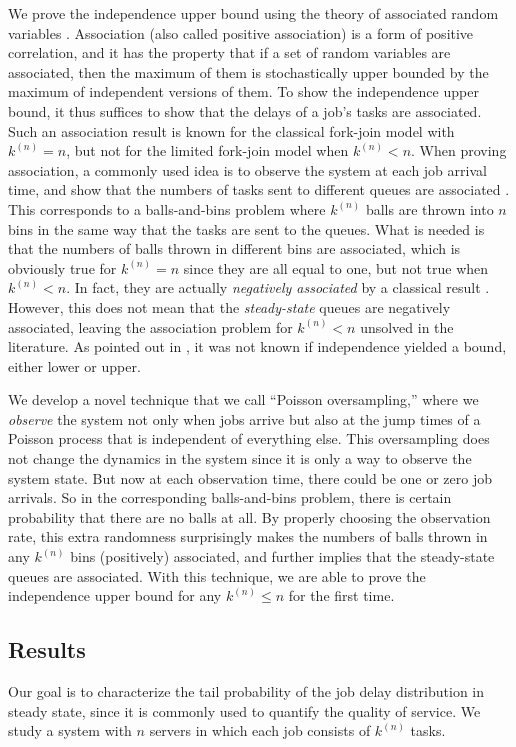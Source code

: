 \documentclass[sigconf]{acmart}
\newcommand{\supn}{^{(n)}}
\begin{document}
We prove the independence upper bound using the theory of associated random variables \cite{EsaProWal_67}. Association (also called positive association) is a form of positive correlation, and it has the property that if a set of random variables are associated, then the maximum of them is stochastically upper bounded by the maximum of independent versions of them.  To show the independence upper bound, it thus suffices to show that the delays of a job's tasks are associated.  Such an association result is known for the classical fork-join model with $k\supn = n$, but not for the limited fork-join model when $k\supn<n$. When proving association, a commonly used idea is to observe the system at each job arrival time, and show that the numbers of tasks sent to different queues are associated \cite{NelTan_88,KumSho_93,ShaBouBac_17}. This corresponds to a balls-and-bins problem where $k\supn$ balls are thrown into $n$ bins in the same way that the tasks are sent to the queues. What is needed is that the numbers of balls thrown in different bins are associated, which is obviously true for $k\supn=n$ since they are all equal to one, but not true when $k\supn<n$.  In fact, they are actually \emph{negatively associated} by a classical result \cite{JoaPro_83}.  However, this does not mean that the \emph{steady-state} queues are negatively associated, leaving the association problem for $k\supn<n$ unsolved in the literature. As pointed out in \cite{LeeShaHua_17}, it was not known if independence yielded a bound, either lower or upper. 


We develop a novel technique that we call ``Poisson oversampling,'' where we \emph{observe} the system not only when jobs arrive but also at the jump times of a Poisson process that is independent of everything else.  This oversampling does not change the dynamics in the system since it is only a way to observe the system state.  But now at each observation time, there could be one or zero job arrivals.  So in the corresponding balls-and-bins problem, there is certain probability that there are no balls at all.  By properly choosing the observation rate, this extra randomness surprisingly makes the numbers of balls thrown in any $k\supn$ bins (positively) associated, and further implies that the steady-state queues are associated.  With this technique, we are able to prove the independence upper bound for any $k\supn\le n$ for the first time.





\subsection*{\normalsize{Results}}
Our goal is to characterize the tail probability of the job delay distribution in steady state, since it is commonly used to quantify the quality of service.  We study a system with $n$ servers in which each job consists of $k\supn$ tasks.
 
\end{document}
